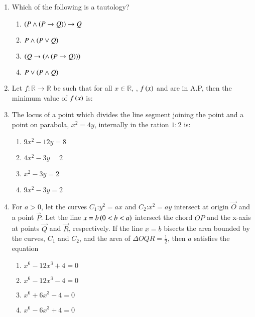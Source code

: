 \documentclass[journal,12pt,onecolumn]{IEEEtran}
\theoremstyle{remark}
\begin{document}
\begin{enumerate}
\item Which of the following is a tautology?
\begin{enumerate}
\item $\left(P\wedge\left(P\rightarrow Q\right)\right)\rightarrow Q$
\item $P\wedge \left(P\vee Q\right)$
\item $\left(Q\rightarrow\left(\wedge\left(P\rightarrow Q\right)\right)\right)$
\item $P\vee \left(P\wedge Q\right)$
\end{enumerate}

\item Let $f:\mathbb{R}\rightarrow\mathbb{R}$ be such that for all $x\in\mathbb{R}$, , $f\left(x\right)$ and  are in A.P, then the minimum value of $f\left(x\right)$ is:
\begin{enumerate}
\end{enumerate}

\item The locus of a point which divides the line segment joining the point  and a point on parabola, $x^2 = 4y$, internally in the ration $1:2$ is:
\begin{enumerate}
\item $9x^2-12y=8$
\item $4x^2-3y=2$
\item $x^2-3y=2$
\item $9x^2-3y=2$
\end{enumerate}

\item For $a>0$, let the curves $C_1$:$y^2=ax$ and $C_2$:$x^2=ay$ intersect at origin $\vec{O}$ and a point $\vec{P}$. Let the line $x=b\left(0<b<a\right)$ intersect the chord $OP$ and the x-axis at points $\vec{Q}$ and $\vec{R}$, respectively. If the line $x=b$ bisects the area bounded by the curves, $C_1$ and $C_2$, and the area of $\Delta OQR = \frac{1}{2}$, then $a$ satisfies the equation
\begin{enumerate}
\item $x^6-12x^3+4=0$
\item $x^6-12x^3-4=0$
\item $x^6+6x^3-4=0$
\item $x^6-6x^3+4=0$
\end{enumerate}


\end{enumerate}
\end{document}
